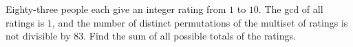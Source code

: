 Eighty-three people each give an integer rating from $1$ to $10$. The gcd of all ratings is $1$, and the number of distinct permutations of the multiset of ratings is not divisible by $83$. Find the sum of all possible totals of the ratings.
